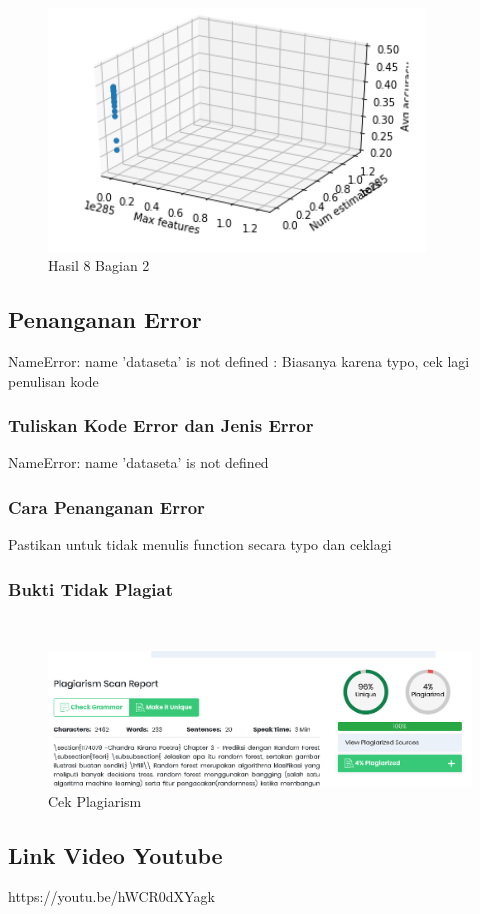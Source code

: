 
\begin{figure}[H]
\centerline{\includegraphics[width=10cm]{figures/1174079/3/praktek32.PNG}}
\caption{Hasil 8 Bagian 2}
\label{labelgambar}
\end{figure}


\subsection{Penanganan Error}
NameError: name 'dataseta' is not defined : Biasanya karena typo, cek lagi penulisan kode

\subsubsection{Tuliskan Kode Error dan Jenis Error}
NameError: name 'dataseta' is not defined

\subsubsection{Cara Penanganan Error}
Pastikan untuk tidak menulis function secara typo dan ceklagi

\subsubsection{Bukti Tidak Plagiat}
\hfill\\
\begin{figure}[H]
	\centering
	\includegraphics[width=12cm]{figures/1174079/3/plagiarismchecker.PNG}
	\caption{Cek Plagiarism}
\end{figure}


\subsection{Link Video Youtube}
https://youtu.be/hWCR0dXYagk
